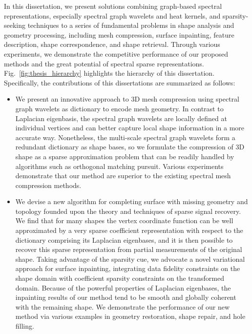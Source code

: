 In this dissertation, we present solutions combining graph-based spectral
representations, especially spectral graph wavelets and heat kernels, and
sparsity-seeking techniques to a series of fundamental problems in shape
analysis and geometry processing, including mesh compression, surface
inpainting, feature description, shape correspondence, and shape retrieval.
Through various experiments, we demonstrate the competitive performance of
our proposed methods and the great potential of spectral sparse
representations. Fig.~\ref{fig:thesis_hierarchy} highlights the hierarchy
of this dissertation. Specifically, the contributions of this dissertations
are summarized as follows:

\begin{itemize}
\item We present an innovative approach to 3D mesh compression using spectral graph
wavelets as dictionary to encode mesh geometry. In contrast to
Laplacian eigenbasis, the spectral graph wavelets are locally
defined at individual vertices and can better capture local shape
information in a more accurate way. Nonetheless, the multi-scale
spectral graph wavelets form a redundant dictionary as shape bases,
so we formulate the compression of 3D shape as a sparse
approximation problem that can be readily handled by
algorithms such as orthogonal matching pursuit. Various experiments
demonstrate that our method are superior to the existing spectral
mesh compression methods.

\item  We devise a new algorithm for completing surface with
  missing geometry and topology founded upon the theory and techniques
  of sparse signal recovery. We find that for many shapes the vertex coordinate function
  can be well approximated by a very sparse coefficient representation with respect
  to the dictionary comprising its Laplacian eigenbases, and it is then possible to
  recover this sparse representation from partial measurements of the original shape.
  Taking advantage of the sparsity cue, we advocate a novel
  variational approach for surface inpainting, integrating data
  fidelity constraints on the shape domain with coefficient sparsity
  constraints on the transformed domain. Because of the powerful
  properties of Laplacian eigenbases, the inpainting results of our
  method tend to be smooth and globally coherent with the remaining
  shape. We demonstrate the performance of our new method via various
  examples in geometry restoration, shape repair, and hole filling.


\end{itemize}
